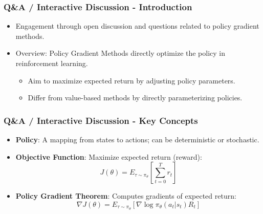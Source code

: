 \documentclass[aspectratio=169]{beamer}
\begin{document}
\begin{frame}[fragile]
    \frametitle{Q\&A / Interactive Discussion - Introduction}
    \begin{itemize}
        \item Engagement through open discussion and questions related to policy gradient methods.
        \item Overview: Policy Gradient Methods directly optimize the policy in reinforcement learning.
        \begin{itemize}
            \item Aim to maximize expected return by adjusting policy parameters.
            \item Differ from value-based methods by directly parameterizing policies.
        \end{itemize}
    \end{itemize}
\end{frame}

\begin{frame}[fragile]
    \frametitle{Q\&A / Interactive Discussion - Key Concepts}
    \begin{itemize}
        \item \textbf{Policy}: A mapping from states to actions; can be deterministic or stochastic.
        \item \textbf{Objective Function}: Maximize expected return (reward):
        \begin{equation}
            J(\theta) = E_{\tau \sim \pi_\theta} \left[ \sum_{t=0}^{T} r_t \right]
        \end{equation}
        \item \textbf{Policy Gradient Theorem}: Computes gradients of expected return:
        \begin{equation}
            \nabla J(\theta) = E_{\tau \sim \pi_\theta} \left[ \nabla \log \pi_\theta(a_t | s_t) R_t \right]
        \end{equation}
    \end{itemize}
\end{frame}
\end{document}
